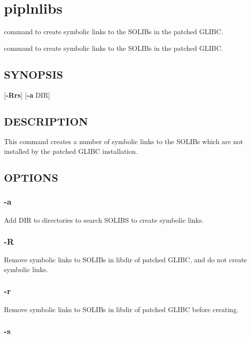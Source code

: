 \hypertarget{group__piplnlibs}{\section{piplnlibs}
\label{group__piplnlibs}
}


command to create symbolic links to the S\-O\-L\-I\-Bs in the patched G\-L\-I\-B\-C.  


command to create symbolic links to the S\-O\-L\-I\-Bs in the patched G\-L\-I\-B\-C. \hypertarget{group__piplnlibs_synopsis}{}\subsection{S\-Y\-N\-O\-P\-S\-I\-S}\label{group__piplnlibs_synopsis}
{ }\mbox{[}{\bfseries -\/\-Rrs}\mbox{]} \mbox{[}{\bfseries -\/a} D\-I\-R\mbox{]}\hypertarget{group__piplnlibs_description}{}\subsection{D\-E\-S\-C\-R\-I\-P\-T\-I\-O\-N}\label{group__piplnlibs_description}
This command creates a number of symbolic links to the S\-O\-L\-I\-Bs which are not installed by the patched G\-L\-I\-B\-C installation.\hypertarget{group__piplnlibs_options}{}\subsection{O\-P\-T\-I\-O\-N\-S}\label{group__piplnlibs_options}
\hypertarget{group__piplnlibs_add}{}\subsubsection{-\/a}\label{group__piplnlibs_add}
Add D\-I\-R to directories to search S\-O\-L\-I\-B\-S to create symbolic links.\hypertarget{group__piplnlibs_remove_only}{}\subsubsection{-\/\-R}\label{group__piplnlibs_remove_only}
Remove symbolic links to S\-O\-L\-I\-Bs in libdir of patched G\-L\-I\-B\-C, and do not create symbolic links.\hypertarget{group__piplnlibs_remove}{}\subsubsection{-\/r}\label{group__piplnlibs_remove}
Remove symbolic links to S\-O\-L\-I\-Bs in libdir of patched G\-L\-I\-B\-C before creating.\hypertarget{group__piplnlibs_silent}{}\subsubsection{-\/s}\label{group__piplnlibs_silent}
